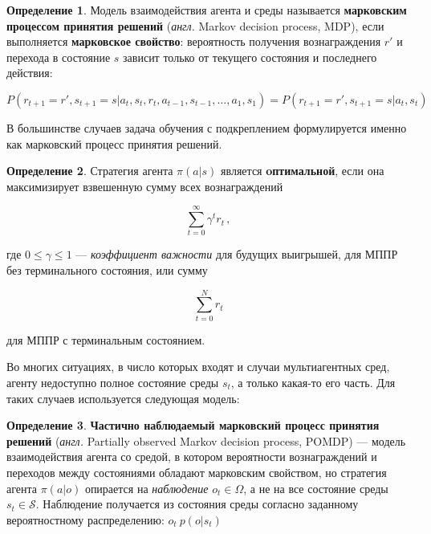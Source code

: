 \documentclass[specification,annotation,times]{itmo-student-thesis}
\theoremstyle{definition}
\newtheorem{definition-ru}{Определение}
\begin{document}
\begin{definition-ru}
  Модель взаимодействия агента и среды называется \textbf{марковским процессом
    принятия решений} (\textit{англ.} Markov decision process, MDP), если
  выполняется \textbf{марковское свойство}:
  вероятность получения вознаграждения $r'$ и перехода в состояние $s$ зависит
  только от текущего состояния и последнего действия:

  \begin{equation}
    P(r_{t+1} = r', s_{t+1} = s | a_t, s_t, r_t, a_{t-1}, s_{t-1}, \ldots, a_1,
    s_1) = P(r_{t+1} = r', s_{t+1} = s | a_t, s_t)
  \end{equation}
\end{definition-ru}

В большинстве случаев задача обучения с подкреплением формулируется именно как
марковский процесс принятия решений.

\begin{definition-ru}
  Стратегия агента $\pi(a | s)$ является \textbf{oптимальной}, если она
  максимизирует взвешенную сумму всех вознаграждений

  \begin{equation}\label{eq:reward-sum}
    \sum\limits_{t=0}^{\infty} {\gamma^t r_t} \,,
  \end{equation}

  где $0 \leqslant \gamma \leqslant 1$ --- \textit{коэффициент важности} для
  будущих выигрышей, для МППР без терминального состояния, или сумму

  \begin{equation}\label{eq:reward-sum}
    \sum\limits_{t=0}^{N} {r_t}
  \end{equation}

  для МППР с терминальным состоянием.
\end{definition-ru}

Во многих ситуациях, в число которых входят и случаи мультиагентных сред, агенту
недоступно полное состояние среды $s_t$, а только какая-то его часть. Для таких
случаев используется следующая модель:

\begin{definition-ru}
  \textbf{Частично наблюдаемый марковский процесс принятия решений}
  (\textit{англ.} Partially observed Markov decision process, POMDP) --- модель
  взаимодействия агента со средой, в котором вероятности вознаграждений и
  переходов между состояниями обладают марковским свойством, но стратегия агента
  $\pi(a | o)$ опирается на \textit{наблюдение} $o_t \in \mathcal{\Omega}$, а не
  на все состояние среды $s_t \in \mathcal{S}$. Наблюдение получается из
  состояния среды согласно заданному вероятностному распределению:
  $o_t ~ p(o | s_t)$
\end{definition-ru}
\end{document}

